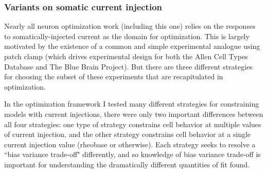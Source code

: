 \subsubsection{Variants on somatic current injection}
Nearly all neuron optimization work (including this one) relies on the responses to somatically-injected current as the domain for optimization.
This is largely motivated by the existence of a common and simple experimental analogue using patch clamp (which drives experimental design for both the Allen Cell Types Database and The Blue Brain Project).
But there are three different strategies for choosing the subset of these experiments that are recapitulated in optimization.





In the optimization framework I tested many different strategies for constraining models with current injections, there were only two important differences between all four strategies: one type of strategy constrains cell behavior at multiple values of current injection, and the other strategy constrains cell behavior at a single current injection value (rheobase or otherwise). Each strategy seeks to resolve a ``bias variance trade-off" differently, and so knowledge of bias variance trade-off is important for understanding the dramatically different quantities of fit found.

